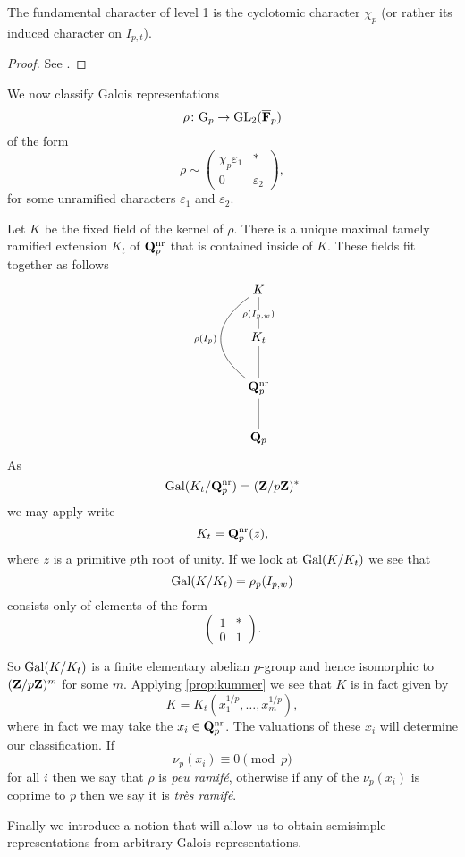 \documentclass[a4paper,12pt]{article}
\begin{document}
\begin{prop}
The fundamental character of level 1 is the cyclotomic character $\chi_p$ (or rather its induced character on $I_{p,t}$).
\end{prop}
\begin{proof}
See \cite[prop. 8]{Serre72}.
\end{proof}


\begin{defn}
We now classify Galois representations
\[
\rho\colon\mathrm{G}_p\to\operatorname{GL}_2(\overline{\mathbf{F}}_p)
\]
of the form
\[
\rho\sim
\begin{pmatrix}
\chi_p\varepsilon_1 & * \\
0 & \varepsilon_2\end{pmatrix},
\]
for some unramified characters $\varepsilon_1$ and $\varepsilon_2$.

Let $K$ be the fixed field of the kernel of $\rho$.
There is a unique maximal tamely ramified extension $K_t$ of $\mathbf{Q}_p^{\mathrm{nr}}$ that is contained inside of $K$.
These fields fit together as follows %
\[
\xymatrix{
K      \ar@{-}[d]|{\rho(I_{p,w})} \ar@{-}@/_2.5pc/[dd]_{\rho(I_{p})}\\
K_t \ar@{-}[d] \\
\Qp^\nr \ar@{-}[d]\\
\Qp \\
}
\]
As
\[
\operatorname{Gal}(K_t/\mathbf{Q}_p^{\mathrm{nr}}) = (\mathbf{Z}/p\mathbf{Z})^*
\]
we may apply write
\[
K_t = \mathbf{Q}_p^{\mathrm{nr}}(z),
\]
where $z$ is a primitive $p$th root of unity.
If we look at $\operatorname{Gal}(K/K_t)$ we see that
\[
\operatorname{Gal}(K/K_t) = \rho_p(I_{p,w})
\]
consists only of elements of the form
\[
\begin{pmatrix}
1 & * \\
0 & 1 \end{pmatrix}.
\]

So $\operatorname{Gal}(K/K_t)$ is a finite elementary abelian $p$-group and hence isomorphic to $(\mathbf{Z}/p\mathbf{Z})^m$ for some $m$.
Applying \cref{prop:kummer} we see that $K$ is in fact given by
\[
K = K_t(x_1^{1/p},\ldots,x_m^{1/p}),
\]
where in fact we may take the $x_i\in\mathbf{Q}_p^{\mathrm{nr}}$.
The valuations of these $x_i$ will determine our classification.
If
\[
\nu_p(x_i) \equiv 0 \pmod{p}
\]
for all $i$ then we say that $\rho$ is \emph{peu ramif\'e}, otherwise if any of the $\nu_p(x_i)$ is coprime to $p$ then we say it is \emph{tr\`es ramif\'e}.
\end{defn}

Finally we introduce a notion that will allow us to obtain semisimple representations from arbitrary Galois representations.
\end{document}
